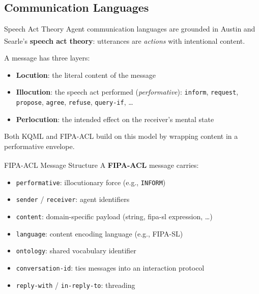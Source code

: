 \subsection{Communication Languages}

\begin{v3topic}{Speech Act Theory}
    Agent communication languages are grounded in Austin and Searle's
    \textbf{speech act theory}: utterances are \emph{actions} with
    intentional content.\textsuperscript{\cite[][p.~184]{wooldridgeIntroductionMultiAgentSystems2009}}

    A message has three layers:
    \begin{itemize}
        \item \textbf{Locution}: the literal content of the message
        \item \textbf{Illocution}: the speech act performed (\emph{performative}):
              \texttt{inform}, \texttt{request}, \texttt{propose}, \texttt{agree},
              \texttt{refuse}, \texttt{query-if}, \ldots
        \item \textbf{Perlocution}: the intended effect on the receiver's mental state
    \end{itemize}
    Both KQML and FIPA-ACL build on this model by wrapping content in a
    performative envelope.

\end{v3topic}
\begin{v3topic}{FIPA-ACL Message Structure}
    A \textbf{FIPA-ACL} message carries:\textsuperscript{\cite[][Ch.~3]{bellifeministeDevelopingMultiAgentSystems2007}}
    \begin{itemize}
        \item \texttt{performative}: illocutionary force (e.g., \texttt{INFORM})
        \item \texttt{sender} / \texttt{receiver}: agent identifiers
        \item \texttt{content}: domain-specific payload (string, fipa-sl expression, \ldots)
        \item \texttt{language}: content encoding language (e.g., FIPA-SL)
        \item \texttt{ontology}: shared vocabulary identifier
        \item \texttt{conversation-id}: ties messages into an interaction protocol
        \item \texttt{reply-with} / \texttt{in-reply-to}: threading
    \end{itemize}

\end{v3topic}
